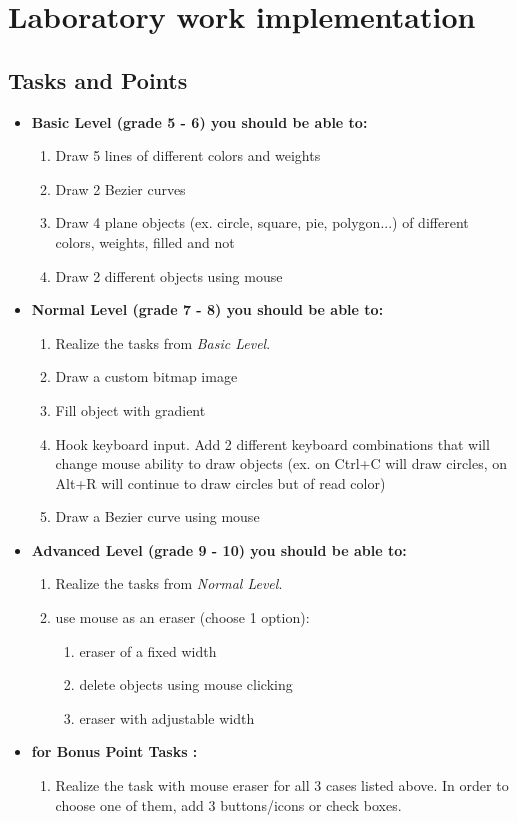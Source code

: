 \section{Laboratory work implementation}

\subsection{Tasks and Points}
\begin{itemize}
\item \textbf{Basic Level (grade 5 - 6) you should be able to:}
	\begin{enumerate}
	\item Draw 5 lines of different colors and weights
      \item Draw 2 Bezier curves
      \item Draw 4 plane objects (ex. circle, square, pie, polygon...) of different colors, weights, filled and not
      \item Draw 2 different objects using mouse
      \end{enumerate}
\item \textbf{Normal Level (grade 7 - 8) you should be able to:}
      \begin{enumerate}
    \item Realize the tasks from \textit{Basic Level}.
    \item Draw a custom bitmap image
    \item Fill object with gradient
    \item Hook keyboard input. Add 2 different keyboard combinations that will change mouse ability to draw objects (ex. on Ctrl+C will draw circles, on Alt+R will continue to draw circles but of read color)
    \item Draw a Bezier curve using mouse
          \end{enumerate}
\item \textbf{Advanced Level (grade 9 - 10) you should be able to:}
      \begin{enumerate}
    \item Realize the tasks from \textit{Normal Level}.
    \item use mouse as an eraser (choose 1 option):
    	\begin{enumerate}
        \item eraser of a fixed width
        \item delete objects using mouse clicking
        \item eraser with adjustable width
        \end{enumerate}
          \end{enumerate}
\item \textbf{for Bonus Point Tasks :}
\begin{enumerate}
	\item Realize the task with mouse eraser for all 3 cases listed above. In order to choose one of them, add 3 buttons/icons or check boxes.
    \end{enumerate}
  \end{itemize}  

